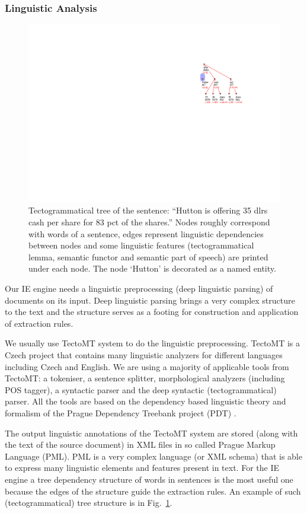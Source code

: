 \subsubsection{Linguistic Analysis}


\begin{figure}
\centerline{\includegraphics[angle=90, width=0.4\hsize]{tree}}
\caption{Tectogrammatical tree of the sentence: ``Hutton is offering 35 dlrs cash per share for 83 pct of the shares.''
Nodes roughly correspond with words of a sentence, edges represent linguistic dependencies between nodes and some linguistic features (tectogrammatical lemma, semantic functor and semantic part of speech) are printed under each node. The node `Hutton' is decorated as a named entity.}
\label{img:tree}
\end{figure}


Our IE engine needs a linguistic preprocessing (deep linguistic parsing) of documents on its input. Deep linguistic parsing brings a very complex structure to the text and the structure serves as a footing for construction and application of extraction rules. 

We usually use TectoMT system \citep{dedek:ZaPtTectoMTHighly2008} to do the linguistic preprocessing. TectoMT is a Czech project that contains many linguistic analyzers for different languages including Czech and English. We are using a majority of applicable tools from TectoMT: a tokeniser, a sentence splitter, morphological analyzers (including POS tagger), a syntactic parser and the deep syntactic (tectogrammatical) parser. All the tools are based on the dependency based linguistic theory and formalism of the Prague Dependency Treebank project (PDT) \citep{dedek:PDT20_CD}.

The output linguistic annotations of the TectoMT system are stored (along with the text of the source document) in XML files in so called Prague Markup Language (PML). PML is a very complex language (or XML schema) that is able to express many linguistic elements and features present in text. For the IE engine a tree dependency structure of words in sentences is the most useful one because the edges of the structure guide the extraction rules. An example of such (tectogrammatical) tree structure is in Fig.~\ref{img:tree}.

